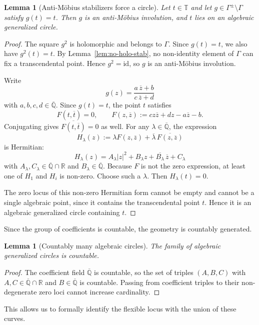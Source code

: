\documentclass[11pt,a4paper]{article}
\theoremstyle{plain}
\newtheorem{lemma}[theorem]{Lemma}
\theoremstyle{definition}
\newcommand{\id}{\mathrm{id}}
\newcommand{\R}{\mathbb{R}}
\newcommand{\Alg}{\overline{\mathbb{Q}}}
\newcommand{\trans}{\mathbb{T}}
\newcommand{\Tc}{\trans}
\begin{document}
\begin{lemma}[Anti-M\"obius stabilizers force a circle]\label{lem:anti-fix}
	Let $t\in\Tc$ and let $g\in\Gamma^{\pm}\setminus\Gamma$ satisfy $g(t)=t$. Then $g$ is an anti-Möbius involution, and $t$ lies on an algebraic generalized circle.
\end{lemma}
\begin{proof}
	The square $g^2$ is holomorphic and belongs to $\Gamma$. Since $g(t)=t$, we also have $g^2(t)=t$. By Lemma~\ref{lem:no-holo-stab}, no non-identity element of $\Gamma$ can fix a transcendental point. Hence $g^2=\id$, so $g$ is an anti-Möbius involution.
	
	Write
	\[
		g(z)=\frac{a\,\overline z+b}{c\,\overline z+d}
	\]
	with $a,b,c,d\in\Alg$. Since $g(t)=t$, the point $t$ satisfies
	\[
		F(t,\overline t)=0,\qquad
		F(z,\overline z):=cz\overline z+d z-a\overline z-b.
	\]
	Conjugating gives $\overline{F(t,\overline t)}=0$ as well. For any $\lambda\in\Alg$, the expression
	\[
		H_\lambda(z):=\lambda F(z,\overline z)+\overline{\lambda}\,\overline{F(z,\overline z)}
	\]
	is Hermitian:
	\[
		H_\lambda(z)
		=
		A_\lambda |z|^2+B_\lambda z+\overline{B_\lambda}\,\overline z+C_\lambda
	\]
	with $A_\lambda,C_\lambda\in\Alg\cap\R$ and $B_\lambda\in\Alg$. Because $F$ is not the zero expression, at least one of $H_1$ and $H_i$ is non-zero. Choose such a $\lambda$. Then $H_\lambda(t)=0$.
	
	The zero locus of this non-zero Hermitian form cannot be empty and cannot be a single algebraic point, since it contains the transcendental point $t$. Hence it is an algebraic generalized circle containing $t$.
\end{proof}

Since the group of coefficients is countable, the geometry is countably generated.

\begin{lemma}[Countably many algebraic circles]\label{lem:countable-circles}
	The family of algebraic generalized circles is countable.
\end{lemma}
\begin{proof}
	The coefficient field $\Alg$ is countable, so the set of triples $(A,B,C)$ with $A,C\in\Alg\cap\R$ and $B\in\Alg$ is countable. Passing from coefficient triples to their non-degenerate zero loci cannot increase cardinality.
\end{proof}

This allows us to formally identify the flexible locus with the union of these curves.
\end{document}
